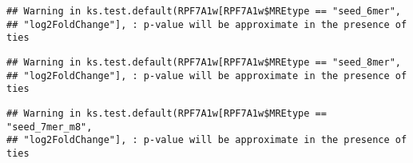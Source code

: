 \documentclass[
]{article}
\newenvironment{Shaded}{\begin{snugshade}}{\end{snugshade}}
\newcommand{\FunctionTok}[1]{\textcolor[rgb]{0.13,0.29,0.53}{\textbf{#1}}}
\newcommand{\NormalTok}[1]{#1}
\newcommand{\OtherTok}[1]{\textcolor[rgb]{0.56,0.35,0.01}{#1}}
\newcommand{\SpecialCharTok}[1]{\textcolor[rgb]{0.81,0.36,0.00}{\textbf{#1}}}
\newcommand{\StringTok}[1]{\textcolor[rgb]{0.31,0.60,0.02}{#1}}
\begin{document}
\begin{verbatim}
## Warning in ks.test.default(RPF7A1w[RPF7A1w$MREtype == "seed_6mer",
## "log2FoldChange"], : p-value will be approximate in the presence of ties
\end{verbatim}

\begin{Shaded}
\end{Shaded}

\begin{verbatim}
## Warning in ks.test.default(RPF7A1w[RPF7A1w$MREtype == "seed_8mer",
## "log2FoldChange"], : p-value will be approximate in the presence of ties
\end{verbatim}

\begin{Shaded}
\end{Shaded}

\begin{verbatim}
## Warning in ks.test.default(RPF7A1w[RPF7A1w$MREtype == "seed_7mer_m8",
## "log2FoldChange"], : p-value will be approximate in the presence of ties
\end{verbatim}

\begin{Shaded}
\end{Shaded}
\end{document}
